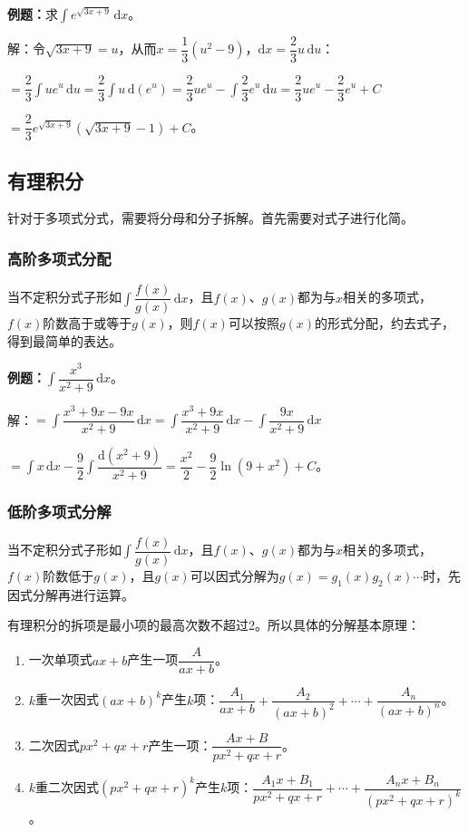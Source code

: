 \documentclass[UTF8, 12pt]{ctexart}
\begin{document}
\textbf{例题：}求$\int e^{\sqrt{3x+9}}\,\textrm{d}x$。

解：令$\sqrt{3x+9}=u$，从而$x=\dfrac{1}{3}(u^2-9)$，$\textrm{d}x=\dfrac{2}{3}u\,\textrm{d}u$：

$=\displaystyle{\dfrac{2}{3}\int ue^u\,\textrm{d}u=\dfrac{2}{3}\int u\,\textrm{d}(e^u)=\dfrac{2}{3}ue^u-\int\dfrac{2}{3}e^u\,\textrm{d}u=\dfrac{2}{3}ue^u-\dfrac{2}{3}e^u+C}$

$=\dfrac{2}{3}e^{\sqrt{3x+9}}(\sqrt{3x+9}-1)+C$。

\subsection{有理积分}

针对于多项式分式，需要将分母和分子拆解。首先需要对式子进行化简。

\subsubsection{高阶多项式分配}

当不定积分式子形如$\displaystyle{\int\dfrac{f(x)}{g(x)}\,\textrm{d}x}$，且$f(x)$、$g(x)$都为与$x$相关的多项式，$f(x)$阶数高于或等于$g(x)$，则$f(x)$可以按照$g(x)$的形式分配，约去式子，得到最简单的表达。

\textbf{例题：}$\displaystyle{\int\dfrac{x^3}{x^2+9}\,\textrm{d}x}$。 \medskip

解：$=\displaystyle{\int\dfrac{x^3+9x-9x}{x^2+9}\,\textrm{d}x=\int\dfrac{x^3+9x}{x^2+9}\,\textrm{d}x-\int\dfrac{9x}{x^2+9}\,\textrm{d}x}$ \medskip

$\displaystyle{=\int x\,\textrm{d}x-\dfrac{9}{2}\int\dfrac{\textrm{d}(x^2+9)}{x^2+9}}=\dfrac{x^2}{2}-\dfrac{9}{2}\ln(9+x^2)+C$。

\subsubsection{低阶多项式分解}

当不定积分式子形如$\displaystyle{\int\dfrac{f(x)}{g(x)}\,\textrm{d}x}$，且$f(x)$、$g(x)$都为与$x$相关的多项式，$f(x)$阶数低于$g(x)$，且$g(x)$可以因式分解为$g(x)=g_1(x)g_2(x)\cdots$时，先因式分解再进行运算。

有理积分的拆项是最小项的最高次数不超过2。所以具体的分解基本原理：

\begin{enumerate}
    \item 一次单项式$ax+b$产生一项$\dfrac{A}{ax+b}$。
    \item $k$重一次因式$(ax+b)^k$产生$k$项：$\dfrac{A_1}{ax+b}+\dfrac{A_2}{(ax+b)^2}+\cdots+\dfrac{A_n}{(ax+b)^n}$。
    \item 二次因式$px^2+qx+r$产生一项：$\dfrac{Ax+B}{px^2+qx+r}$。
    \item $k$重二次因式$(px^2+qx+r)^k$产生$k$项：$\dfrac{A_1x+B_1}{px^2+qx+r}+\cdots+\dfrac{A_nx+B_n}{(px^2+qx+r)^k}$。
\end{enumerate}
\end{document}

